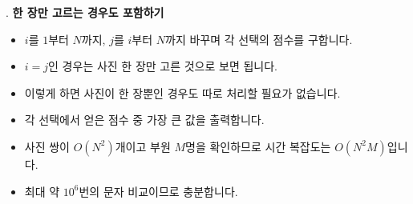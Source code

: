 \begin{frame}{\textbf{\pletter}. \ptitle}
    \textbf{한 장만 고르는 경우도 포함하기}
\begin{itemize}
        \item $i$를 $1$부터 $N$까지, $j$를 $i$부터 $N$까지 바꾸며 각 선택의 점수를 구합니다.
        \item $i=j$인 경우는 사진 한 장만 고른 것으로 보면 됩니다.
        \item 이렇게 하면 사진이 한 장뿐인 경우도 따로 처리할 필요가 없습니다.
        \item 각 선택에서 얻은 점수 중 가장 큰 값을 출력합니다.
        \item 사진 쌍이 $O(N^2)$개이고 부원 $M$명을 확인하므로 시간 복잡도는 $O(N^2M)$입니다.
        \item 최대 약 $10^6$번의 문자 비교이므로 충분합니다.
    \end{itemize}
\end{frame}
